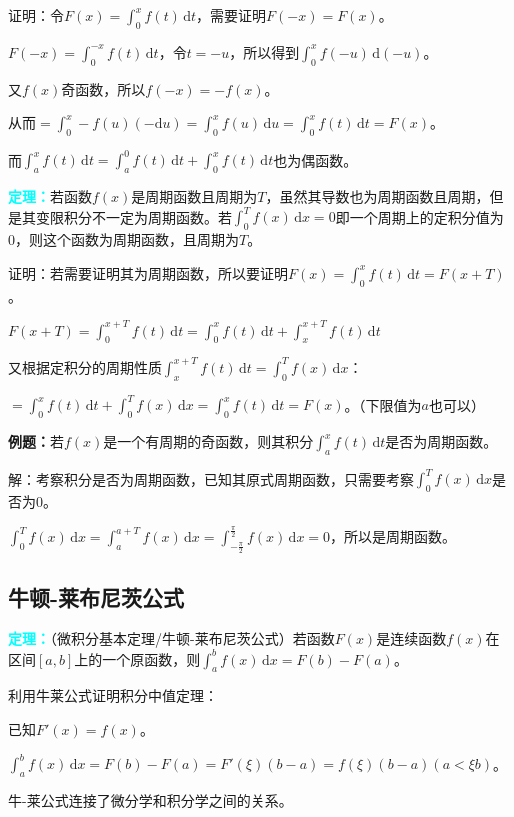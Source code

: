\documentclass[UTF8, 12pt]{ctexart}
\begin{document}
证明：令$F(x)=\int_0^xf(t)\,\textrm{d}t$，需要证明$F(-x)=F(x)$。

$F(-x)=\int_0^{-x}f(t)\,\textrm{d}t$，令$t=-u$，所以得到$\int_0^xf(-u)\,\textrm{d}(-u)$。

又$f(x)$奇函数，所以$f(-x)=-f(x)$。

从而$=\int_0^x-f(u)(-\textrm{d}u)=\int_0^xf(u)\,\textrm{d}u=\int_0^xf(t)\,\textrm{d}t=F(x)$。

而$\int_a^xf(t)\,\textrm{d}t=\int_a^0f(t)\,\textrm{d}t+\int_0^xf(t)\,\textrm{d}t$也为偶函数。

\textcolor{aqua}{\textbf{定理：}}若函数$f(x)$是周期函数且周期为$T$，虽然其导数也为周期函数且周期，但是其变限积分不一定为周期函数。若$\int_0^Tf(x)\,\textrm{d}x=0$即一个周期上的定积分值为0，则这个函数为周期函数，且周期为$T$。

证明：若需要证明其为周期函数，所以要证明$F(x)=\int_0^xf(t)\,\textrm{d}t=F(x+T)$。

$F(x+T)=\int_0^{x+T}f(t)\,\textrm{d}t=\int_0^xf(t)\,\textrm{d}t+\int_x^{x+T}f(t)\,\textrm{d}t$

又根据定积分的周期性质$\int_x^{x+T}f(t)\,\textrm{d}t=\int_0^Tf(x)\,\textrm{d}x$：

$=\int_0^xf(t)\,\textrm{d}t+\int_0^Tf(x)\,\textrm{d}x=\int_0^xf(t)\,\textrm{d}t=F(x)$。（下限值为$a$也可以）

\textbf{例题：}若$f(x)$是一个有周期的奇函数，则其积分$\int_a^xf(t)\,\textrm{d}t$是否为周期函数。

解：考察积分是否为周期函数，已知其原式周期函数，只需要考察$\int_0^Tf(x)\,\textrm{d}x$是否为0。

$\int_0^Tf(x)\,\textrm{d}x=\int_a^{a+T}f(x)\,\textrm{d}x=\int_{-\frac{\pi}{2}}^{\frac{\pi}{2}}f(x)\,\textrm{d}x=0$，所以是周期函数。

\subsection{牛顿-莱布尼茨公式}

\textcolor{aqua}{\textbf{定理：}}（微积分基本定理/牛顿-莱布尼茨公式）若函数$F(x)$是连续函数$f(x)$在区间$[a,b]$上的一个原函数，则$\int_a^bf(x)\,\textrm{d}x=F(b)-F(a)$。

利用牛莱公式证明积分中值定理：

已知$F'(x)=f(x)$。

$\int_a^bf(x)\,\textrm{d}x=F(b)-F(a)=F'(\xi)(b-a)=f(\xi)(b-a)(a<\xi b)$。

牛-莱公式连接了微分学和积分学之间的关系。
\end{document}
